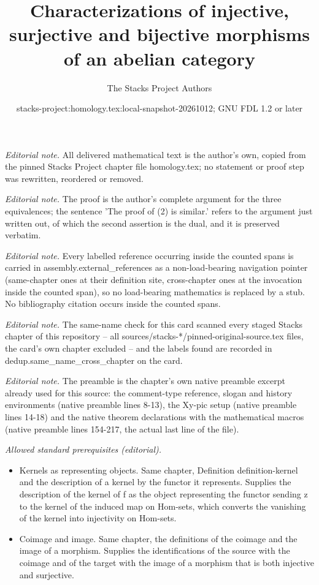 \documentclass[10pt,a4paper]{amsart}
\title{Characterizations of injective, surjective and bijective morphisms of an abelian category}
\author{The Stacks Project Authors}
\date{stacks-project:homology.tex:local-snapshot-20261012; GNU FDL 1.2 or later}
\theoremstyle{plain}
\theoremstyle{definition}
\theoremstyle{remark}
\numberwithin{equation}{subsection}
\begin{document}
\maketitle
\noindent\textit{Editorial note.} All delivered mathematical text is the author's own, copied from the pinned Stacks Project chapter file homology.tex; no statement or proof step was rewritten, reordered or removed.\par\medskip
\noindent\textit{Editorial note.} The proof is the author's complete argument for the three equivalences; the sentence 'The proof of (2) is similar.' refers to the argument just written out, of which the second assertion is the dual, and it is preserved verbatim.\par\medskip
\noindent\textit{Editorial note.} Every labelled reference occurring inside the counted spans is carried in assembly.external\_references as a non-load-bearing navigation pointer (same-chapter ones at their definition site, cross-chapter ones at the invocation inside the counted span), so no load-bearing mathematics is replaced by a stub. No bibliography citation occurs inside the counted spans.\par\medskip
\noindent\textit{Editorial note.} The same-name check for this card scanned every staged Stacks chapter of this repository -- all sources/stacks-*/pinned-original-source.tex files, the card's own chapter excluded -- and the labels found are recorded in dedup.same\_name\_cross\_chapter on the card.\par\medskip
\noindent\textit{Editorial note.} The preamble is the chapter's own native preamble excerpt already used for this source: the comment-type reference, slogan and history environments (native preamble lines 8-13), the Xy-pic setup (native preamble lines 14-18) and the native theorem declarations with the mathematical macros (native preamble lines 154-217, the actual last line of the file).\par\medskip
\noindent\textit{Allowed standard prerequisites (editorial).}\begin{itemize}
\item Kernels as representing objects. Same chapter, Definition definition-kernel and the description of a kernel by the functor it represents. Supplies the description of the kernel of f as the object representing the functor sending z to the kernel of the induced map on Hom-sets, which converts the vanishing of the kernel into injectivity on Hom-sets.
\item Coimage and image. Same chapter, the definitions of the coimage and the image of a morphism. Supplies the identifications of the source with the coimage and of the target with the image of a morphism that is both injective and surjective.
\end{itemize}\medskip
\end{document}
